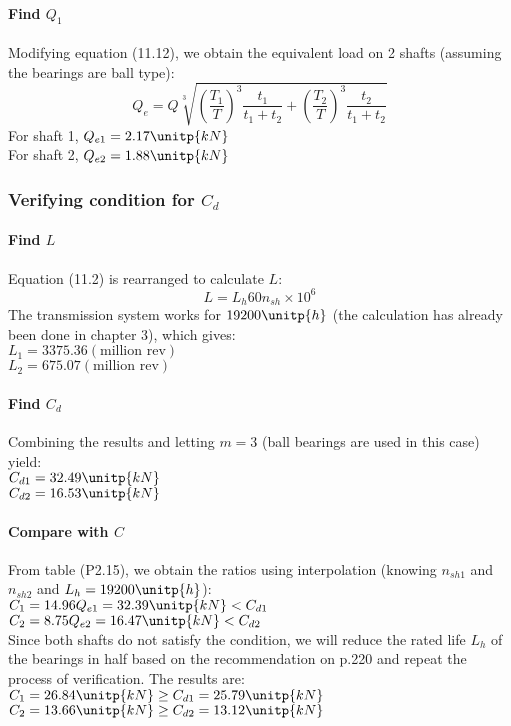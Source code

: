 \paragraph{Find $ Q_1 $} 
Modifying equation (11.12), we obtain the equivalent load on 2 shafts (assuming the bearings are ball type):
\[Q_{e} = Q\sqrt[3]{\left(\dfrac{T_1}{T} \right)^3\dfrac{t_1}{t_1+t_2} + \left(\dfrac{T_2}{T} \right)^3\dfrac{t_2}{t_1+t_2}}\]
For shaft 1, $ Q_{e1}  = 2.17\unitp{kN}  $\\
For shaft 2, $ Q_{e2}  = 1.88\unitp{kN}  $

\subsubsection{Verifying condition for $ C_d $}
\paragraph{Find $ L $}Equation (11.2) is rearranged to calculate $ L $:
\[L = L_h60n_{sh}\times10^6\]
The transmission system works for $ 19200\unitp{h} $ (the calculation has already been done in chapter 3), which gives:\\
$ L_1 = 3375.36 \unit{(\text{million rev})} $\\
$ L_2 = 675.07 \unit{(\text{million rev})} $
\paragraph{Find $ C_d $}
Combining the results and letting $ m=3 $ (ball bearings are used in this case) yield:\\
$ C_{d1} =32.49 \unitp{kN} $\\
$ C_{d2} = 16.53 \unitp{kN} $

\paragraph{Compare with $ C $}
From table (P2.15), we obtain the ratios using interpolation (knowing $ n_{sh1} $ and $ n_{sh2} $ and $ L_h=19200\unitp{h} $):\\
$ C_1 =  14.96 Q_{e1} = 32.39\unitp{kN} < C_{d1}$\\
$ C_2 =  8.75 Q_{e2} = 16.47\unitp{kN} < C_{d2}$\\
Since both shafts do not satisfy the condition, we will reduce the rated life $ L_h $ of the bearings in half based on the recommendation on p.220 and repeat the process of verification. The results are:\\
$ C_1 =  26.84 \unitp{kN} \geq C_{d1} = 25.79\unitp{kN}$\\
$ C_2 = 13.66 \unitp{kN} \geq C_{d2} = 13.12\unitp{kN}$
